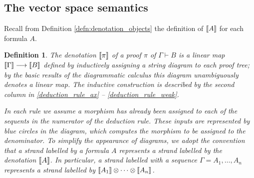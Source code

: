 \documentclass[english,letter paper,12pt,reqno]{article}
\theoremstyle{example}
\newtheorem{definition}[theorem]{Definition}
\numberwithin{equation}{section}
\begin{document}
\subsection{The vector space semantics}\label{section:vector_space_sem}

Recall from Definition \ref{defn:denotation_objects} the definition of $\llbracket A \rrbracket$ for each formula $A$.

\begin{definition}\label{defn:denotation_morphism} The \emph{denotation} $\llbracket \pi \rrbracket$ of a proof $\pi$ of $\Gamma \vdash B$ is a linear map $\llbracket \Gamma \rrbracket \longrightarrow \llbracket B \rrbracket$ defined by inductively assigning a string diagram to each proof tree; by the basic results of the diagrammatic calculus \cite{JSGoTCI} this diagram unambiguously denotes a linear map. The inductive construction is described by the second column in \eqref{deduction_rule_ax} -- \eqref{deduction_rule_weak}. 

In each rule we assume a morphism has already been assigned to each of the sequents in the numerator of the deduction rule. These inputs are represented by blue circles in the diagram, which computes the morphism to be assigned to the denominator. To simplify the appearance of diagrams, we adopt the convention that a strand labelled by a formula $A$ represents a strand labelled by the denotation $\llbracket A \rrbracket$. In particular, a strand labelled with a sequence $\Gamma = A_1,\ldots,A_n$ represents a strand labelled by $\llbracket A_1 \rrbracket \otimes \cdots \otimes \llbracket A_n \rrbracket$.
\end{definition}
\end{document}
